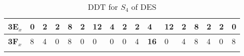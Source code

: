 \begin{longtable}[c]{|l|l|l|l|l|l|l|l|l|l|l|l|l|l|l|l|l|}
\textbf{3E$_x$} & 0              & 2              & 2              & 8              & 2              & 12             & 4              & 2              & 2              & 4              & 12             & 2              & 8              & 2              & 2              & 0              \\ \hline
\textbf{3F$_x$} & 8              & 4              & 0              & 8              & 0              & 0              & 0              & 0              & 4              & \textbf{16}             & 0              & 4              & 8              & 4              & 0              & 8              \\ \hline
\caption{DDT for $S_4$ of DES}
\label{tab:ddt-s4-des}
\end{longtable}